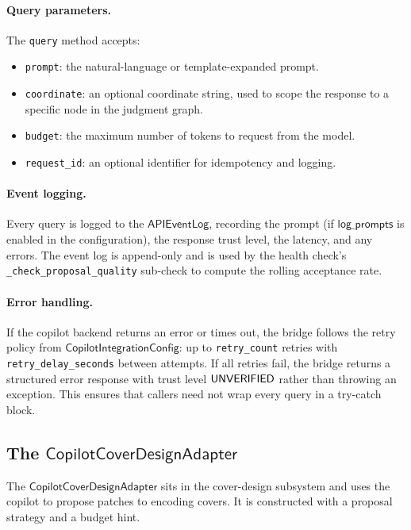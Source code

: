 \documentclass[11pt]{article}
\newcommand{\CIC}{\mathsf{CopilotIntegrationConfig}}
\newcommand{\CCD}{\mathsf{CopilotCoverDesignAdapter}}
\begin{document}
\paragraph{Query parameters.}
The \texttt{query} method accepts:
\begin{itemize}[leftmargin=*]
  \item \texttt{prompt}: the natural-language or template-expanded
        prompt.
  \item \texttt{coordinate}: an optional \JuGeo{} coordinate
        string, used to scope the response to a specific node in
        the judgment graph.
  \item \texttt{budget}: the maximum number of tokens to request
        from the model.
  \item \texttt{request\_id}: an optional identifier for
        idempotency and logging.
\end{itemize}

\paragraph{Event logging.}
Every query is logged to the $\mathsf{APIEventLog}$, recording the
prompt (if $\mathsf{log\_prompts}$ is enabled in the configuration),
the response trust level, the latency, and any errors.  The event
log is append-only and is used by the health check's
\texttt{\_check\_proposal\_quality} sub-check to compute the
rolling acceptance rate.

\paragraph{Error handling.}
If the copilot backend returns an error or times out, the bridge
follows the retry policy from $\CIC$: up to
\texttt{retry\_count} retries with \texttt{retry\_delay\_seconds}
between attempts.  If all retries fail, the bridge returns a
structured error response with trust level $\mathsf{UNVERIFIED}$ rather than
throwing an exception.  This ensures that callers need not wrap
every query in a try-catch block.

\subsection{The \texorpdfstring{$\CCD$}{CopilotCoverDesignAdapter}}

The $\CCD$ sits in the cover-design subsystem and
uses the copilot to propose patches to encoding covers.  It is
constructed with a proposal strategy and a budget hint.
\end{document}
